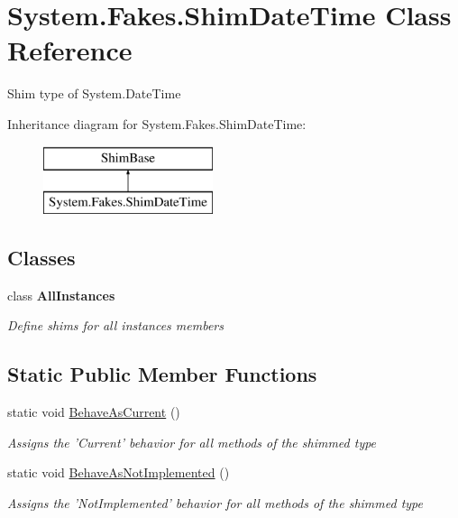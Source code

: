\hypertarget{class_system_1_1_fakes_1_1_shim_date_time}{\section{System.\-Fakes.\-Shim\-Date\-Time Class Reference}
\label{class_system_1_1_fakes_1_1_shim_date_time}
}


Shim type of System.\-Date\-Time 


Inheritance diagram for System.\-Fakes.\-Shim\-Date\-Time\-:\begin{figure}[H]
\begin{center}
\leavevmode
\includegraphics[height=2.000000cm]{class_system_1_1_fakes_1_1_shim_date_time}
\end{center}
\end{figure}
\subsection*{Classes}
\begin{DoxyCompactItemize}
\item 
class {\bfseries All\-Instances}
\begin{DoxyCompactList}\small\item\em Define shims for all instances members\end{DoxyCompactList}\end{DoxyCompactItemize}
\subsection*{Static Public Member Functions}
\begin{DoxyCompactItemize}
\item 
static void \hyperlink{class_system_1_1_fakes_1_1_shim_date_time_affcfe27a28f4317301d1889a87cefcfd}{Behave\-As\-Current} ()
\begin{DoxyCompactList}\small\item\em Assigns the 'Current' behavior for all methods of the shimmed type\end{DoxyCompactList}\item 
static void \hyperlink{class_system_1_1_fakes_1_1_shim_date_time_aa4dea9ec9078dc7778b2df4409056f08}{Behave\-As\-Not\-Implemented} ()
\begin{DoxyCompactList}\small\item\em Assigns the 'Not\-Implemented' behavior for all methods of the shimmed type\end{DoxyCompactList}\end{DoxyCompactItemize}
